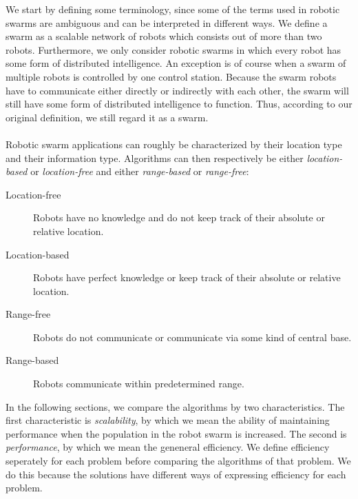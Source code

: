 We start by defining some terminology, since some of the terms used in robotic swarms are ambiguous and can be interpreted in different ways.
We define a swarm as a scalable network of robots which consists out of more than two robots.
Furthermore, we only consider robotic swarms in which every robot has some form of distributed intelligence.
An exception is of course when a swarm of multiple robots is controlled by one control station.
Because the swarm robots have to communicate either directly or indirectly with each other, the swarm will still have some form of distributed intelligence to function.
Thus, according to our original definition, we still regard it as a swarm. \\
\\
Robotic swarm applications can roughly be characterized by their location type and their information type. Algorithms can then respectively be either \emph{location-based} or \emph{location-free} and either \emph{range-based} or \emph{range-free}:
\begin{description}
	\item[Location-free] Robots have no knowledge and do not keep track of their absolute or relative location.
	\item[Location-based] Robots have perfect knowledge or keep track of their absolute or relative location.
	\item[Range-free] Robots do not communicate or communicate via some kind of central base.
	\item[Range-based] Robots communicate within predetermined range.
\end{description}

In the following sections, we compare the algorithms by two characteristics. 
The first characteristic is \emph{scalability}, by which we mean the ability of maintaining performance when the population in the robot swarm is increased. 
The second is \emph{performance}, by which we mean the geneneral efficiency. 
We define efficiency seperately for each problem before comparing the algorithms of that problem. 
We do this because the solutions have different ways of expressing efficiency for each problem.\\

